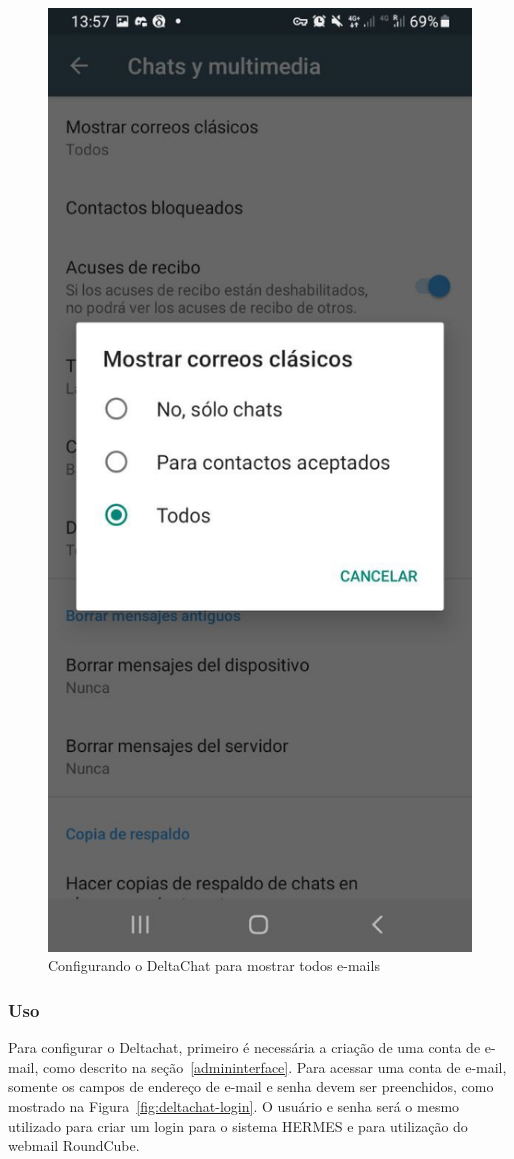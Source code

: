 \documentclass[11pt,a4paper]{article}
\begin{document}
\begin{figure}[H]
    \centering
    \includegraphics[width=0.3\columnwidth]{screenshots/deltachat/es/allemails_es.jpeg}
    	\caption{Configurando o DeltaChat para mostrar todos e-mails}
	\vspace{-10pt}
    \label{fig:deltachat-allemails}
\end{figure}

\subsubsection{Uso}
Para configurar o Deltachat, primeiro é necessária a criação de uma conta de e-mail, como descrito na seção~\ref{admininterface}. Para acessar uma conta de e-mail, somente os campos de endereço de e-mail e senha devem ser preenchidos, como mostrado na Figura~\ref{fig:deltachat-login}. O usuário e senha será o mesmo utilizado para criar um login para o sistema HERMES e para utilização do webmail RoundCube. 


\end{document}
